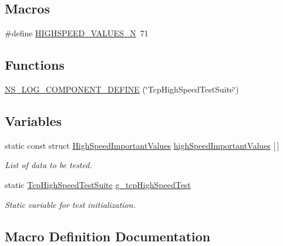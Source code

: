 \subsection*{Macros}
\begin{DoxyCompactItemize}
\item 
\#define \hyperlink{tcp-highspeed-test_8cc_af546f2b6977b6102b96db9a6d5e6db24}{H\+I\+G\+H\+S\+P\+E\+E\+D\+\_\+\+V\+A\+L\+U\+E\+S\+\_\+N}~71
\end{DoxyCompactItemize}
\subsection*{Functions}
\begin{DoxyCompactItemize}
\item 
\hyperlink{tcp-highspeed-test_8cc_a2f8320b3fd113a046031a5281a23b2d5}{N\+S\+\_\+\+L\+O\+G\+\_\+\+C\+O\+M\+P\+O\+N\+E\+N\+T\+\_\+\+D\+E\+F\+I\+NE} (\char`\"{}Tcp\+High\+Speed\+Test\+Suite\char`\"{})
\end{DoxyCompactItemize}
\subsection*{Variables}
\begin{DoxyCompactItemize}
\item 
static const struct \hyperlink{structHighSpeedImportantValues}{High\+Speed\+Important\+Values} \hyperlink{group__internet-test_gae438c206bcae7bc361b00919b5038a18}{high\+Speed\+Important\+Values} \mbox{[}$\,$\mbox{]}
\begin{DoxyCompactList}\small\item\em List of data to be tested. \end{DoxyCompactList}\item 
static \hyperlink{classTcpHighSpeedTestSuite}{Tcp\+High\+Speed\+Test\+Suite} \hyperlink{tcp-highspeed-test_8cc_a163b99b6f933f9cb1c6b0208a342b7b1}{g\+\_\+tcp\+High\+Speed\+Test}
\begin{DoxyCompactList}\small\item\em Static variable for test initialization. \end{DoxyCompactList}\end{DoxyCompactItemize}


\subsection{Macro Definition Documentation}
